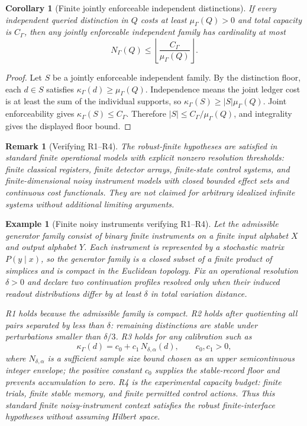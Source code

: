 \documentclass[11pt]{article}
\newtheorem{corollary}[theorem]{Corollary}
\newtheorem{example}[theorem]{Example}
\newtheorem{remark}[theorem]{Remark}
\begin{document}
\begin{corollary}[Finite jointly enforceable independent distinctions]\label{cor:finite-independent-distinctions}
If every independent queried distinction in $Q$ costs at least $\mu_\Gamma(Q)>0$ and total capacity is $C_\Gamma$, then any jointly enforceable independent family has cardinality at most
\[
 N_\Gamma(Q)\le \left\lfloor \frac{C_\Gamma}{\mu_\Gamma(Q)}\right\rfloor .
\]
\end{corollary}
\begin{proof}
Let $S$ be a jointly enforceable independent family.  By the distinction floor, each $d\in S$ satisfies $\kappa_\Gamma(d)\ge\mu_\Gamma(Q)$.  Independence means the joint ledger cost is at least the sum of the individual supports, so $\kappa_\Gamma(S)\ge |S|\mu_\Gamma(Q)$.  Joint enforceability gives $\kappa_\Gamma(S)\le C_\Gamma$.  Therefore $|S|\le C_\Gamma/\mu_\Gamma(Q)$, and integrality gives the displayed floor bound.
\end{proof}

\begin{remark}[Verifying R1--R4]
The robust-finite hypotheses are satisfied in standard finite operational models with explicit nonzero resolution thresholds: finite classical registers, finite detector arrays, finite-state control systems, and finite-dimensional noisy instrument models with closed bounded effect sets and continuous cost functionals.  They are not claimed for arbitrary idealized infinite systems without additional limiting arguments.
\end{remark}


\begin{example}[Finite noisy instruments verifying R1--R4]\label{ex:finite-noisy-instrument-r1r4}
Let the admissible generator family consist of binary finite instruments on a finite input alphabet $X$ and output alphabet $Y$.  Each instrument is represented by a stochastic matrix $P(y\mid x)$, so the generator family is a closed subset of a finite product of simplices and is compact in the Euclidean topology.  Fix an operational resolution $\delta>0$ and declare two continuation profiles resolved only when their induced readout distributions differ by at least $\delta$ in total variation distance.

R1 holds because the admissible family is compact.  R2 holds after quotienting all pairs separated by less than $\delta$: remaining distinctions are stable under perturbations smaller than $\delta/3$.  R3 holds for any calibration such as
\[
  \kappa_\Gamma(d)=c_0+c_1\,N_{\delta,\alpha}(d),
  \qquad c_0,c_1>0,
\]
where $N_{\delta,\alpha}$ is a sufficient sample size bound chosen as an upper semicontinuous integer envelope; the positive constant $c_0$ supplies the stable-record floor and prevents accumulation to zero.  R4 is the experimental capacity budget: finite trials, finite stable memory, and finite permitted control actions.  Thus this standard finite noisy-instrument context satisfies the robust finite-interface hypotheses without assuming Hilbert space.
\end{example}
\end{document}

